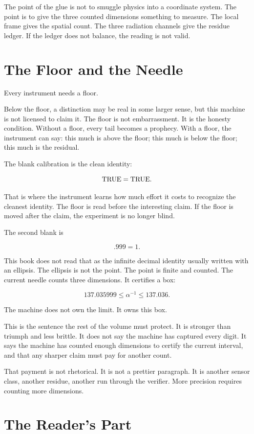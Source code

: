 The point of the glue is not to smuggle physics into a coordinate
system. The point is to give the three counted dimensions something to
measure. The local frame gives the spatial count. The three radiation
channels give the residue ledger. If the ledger does not balance, the
reading is not valid.

\section*{The Floor and the Needle}

Every instrument needs a floor.

Below the floor, a distinction may be real in some larger sense, but
this machine is not licensed to claim it. The floor is not
embarrassment. It is the honesty condition. Without a floor, every tail
becomes a prophecy. With a floor, the instrument can say: this much is
above the floor; this much is below the floor; this much is the
residual.

The blank calibration is the clean identity:

\[
\hbox{TRUE}=\hbox{TRUE}.
\]

That is where the instrument learns how much effort it costs to
recognize the cleanest identity. The floor is read before the
interesting claim. If the floor is moved after the claim, the experiment
is no longer blind.

The second blank is

\[
.999 = 1 .
\]

This book does not read that as the infinite decimal identity usually
written with an ellipsis. The ellipsis is not the point. The point is
finite and counted. The current needle counts three dimensions. It
certifies a box:

\[
137.035999 \leq \alpha^{-1} \leq 137.036 .
\]

The machine does not own the limit. It owns this box.

This is the sentence the rest of the volume must protect. It is stronger
than triumph and less brittle. It does not say the machine has captured
every digit. It says the machine has counted enough dimensions to
certify the current interval, and that any sharper claim must pay for
another count.

That payment is not rhetorical. It is not a prettier paragraph. It is
another sensor class, another residue, another run through the verifier.
More precision requires counting more dimensions.

\section*{The Reader's Part}

